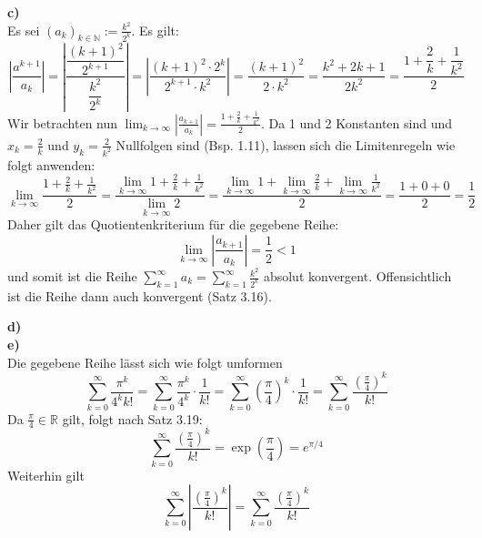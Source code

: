 \documentclass[a4paper,graphics,11pt]{article}
\begin{document}
\textbf{c)}\\[5pt]
Es sei $\displaystyle(a_k)_{k \in \mathbb{N}} := \frac{k^2}{2^k}$. Es gilt:
$$
    \left|\frac{a^{k+1}}{a_k}\right|
    = \left|\frac{\dfrac{(k+1)^2}{2^{k+1}}}{{\dfrac{k^2}{2^k}}}\right|
    = \left|\frac{(k+1)^2 \cdot 2^k}{2^{k+1}\cdot k^2}\right|
    = \frac{(k+1)^2}{2\cdot k^2}
    = \frac{k^2+2k+1}{2k^2}
    = \frac{1+\dfrac{2}{k}+\dfrac{1}{k^2}}{2}
$$
Wir betrachten nun $\displaystyle\lim_{k \to \infty}\limits \left|\frac{a_{k+1}}{a_k}\right|
= \frac{1+\frac{2}{k}+\frac{1}{k^2}}{2}$. Da 1 und 2 Konstanten sind und
$x_k=\frac{2}{k}$ und $y_k=\frac{2}{k^2}$ Nullfolgen sind (Bsp. 1.11), lassen sich
die Limitenregeln wie folgt anwenden:
$$
    \lim_{k \to \infty} \frac{1+\frac{2}{k}+\frac{1}{k^2}}{2}
    = \frac{\lim_{k\to\infty}\limits1+\frac{2}{k}+\frac{1}{k^2}}{\lim_{k \to \infty}\limits 2}
    = \frac{\lim_{k \to \infty}\limits 1 + \lim_{k \to \infty}\limits \frac{2}{k}+ \lim_{k \to \infty}\limits \frac{1}{k^2}}{2}
    = \frac{1+0+0}{2} = \frac{1}{2}
$$
Daher gilt das Quotientenkriterium für die gegebene Reihe:
$$
    \lim_{k \to \infty} \left|\frac{a_{k+1}}{a_k}\right| = \frac{1}{2} < 1
$$
und somit ist die Reihe $\displaystyle\sum_{k=1}^{\infty} a_k = \sum_{k=1}^{\infty} \frac{k^2}{2^k}$
absolut konvergent. Offensichtlich ist die Reihe dann auch konvergent (Satz 3.16).

\textbf{d)}\\[5pt]
\textbf{e)}\\[5pt]
Die gegebene Reihe lässt sich wie folgt umformen
$$
    \sum_{k=0}^{\infty} \frac{\pi^k}{4^kk!}
    = \sum_{k=0}^{\infty} \frac{\pi^k}{4^k}\cdot \frac{1}{k!}
    = \sum_{k=0}^{\infty} \left(\frac{\pi}{4}\right)^k \cdot \frac{1}{k!}
    = \sum_{k=0}^{\infty} \frac{\left(\frac{\pi}{4}\right)^k}{k!}
$$
Da $\frac{\pi}{4} \in \mathbb{R}$ gilt, folgt nach Satz 3.19:
$$
    \sum_{k=0}^{\infty} \frac{\left(\frac{\pi}{4}\right)^k}{k!}
    = \exp\left(\frac{\pi}{4}\right)= e^{\pi/4}
$$
Weiterhin gilt
$$
    \sum_{k=0}^{\infty} \left|\frac{\left(\frac{\pi}{4}\right)^k}{k!} \right|
    = \sum_{k=0}^{\infty}\frac{\left(\frac{\pi}{4}\right)^k}{k!} 
$$
\end{document}
